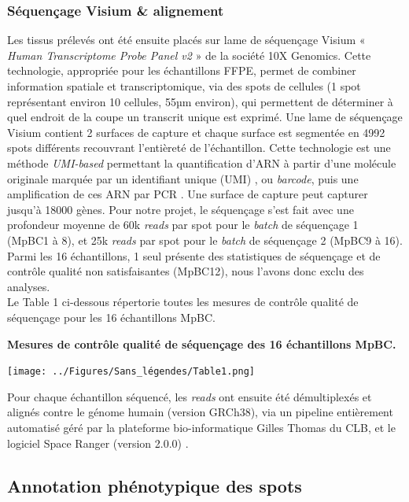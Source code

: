 \documentclass[11pt]{article}
\begin{document}
\subsubsection{Séquençage Visium \& alignement}

Les tissus prélevés ont été ensuite placés sur lame de séquençage Visium « \textit{Human Transcriptome Probe Panel v2} » de la société 10X Genomics. Cette technologie, appropriée pour les échantillons FFPE, permet de combiner information spatiale et transcriptomique, via des spots de cellules (1 spot représentant environ 10 cellules, 55µm environ), qui permettent de déterminer à quel endroit de la coupe un transcrit unique est exprimé. Une lame de séquençage Visium contient 2 surfaces de capture et chaque surface est segmentée en 4992 spots différents recouvrant l’entièreté de l’échantillon. Cette technologie est une méthode \textit{UMI-based} permettant la quantification d’ARN à partir d’une molécule originale marquée par un identifiant unique (UMI) \cite{UMI}, ou \textit{barcode}, puis une amplification de ces ARN par PCR \cite{10xSpatialIntro}. Une surface de capture peut capturer jusqu’à 18000 gènes. Pour notre projet, le séquençage s’est fait avec une profondeur moyenne de 60k \textit{reads} par spot pour le \textit{batch} de séquençage 1 (MpBC1 à 8), et 25k \textit{reads} par spot pour le \textit{batch} de séquençage 2 (MpBC9 à 16). Parmi les 16 échantillons, 1 seul présente des statistiques de séquençage et de contrôle qualité non satisfaisantes (MpBC12), nous l’avons donc exclu des analyses. \\
Le Table 1 ci-dessous répertorie toutes les mesures de contrôle qualité de séquençage pour les 16 échantillons MpBC. 

\begin{table}[H]
    \centering
    \caption[\textbf{Table 1 : Mesures de contrôle qualité de séquençage des 16 échantillons MpBC.}]{\footnotesize \textbf{Mesures de contrôle qualité de séquençage des 16 échantillons MpBC.}}
    \texttt{[image: ../Figures/Sans\_légendes/Table1.png]}
    \label{tab:table1}
\end{table}

Pour chaque échantillon séquencé, les \textit{reads} ont ensuite été démultiplexés et alignés contre le génome humain (version GRCh38), via un pipeline entièrement automatisé géré par la plateforme bio-informatique Gilles Thomas du CLB, et le logiciel Space Ranger (version 2.0.0) \cite{SpaceRanger2}.

\subsection{Annotation phénotypique des spots}
\end{document}
